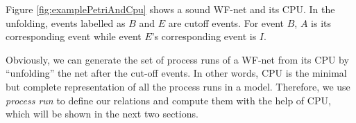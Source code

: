 \documentclass{llncs}
\begin{document}
\begin{example}\label{ex:petriAndCpu}
Figure \ref{fig:examplePetriAndCpu} shows a sound WF-net and its CPU. In the unfolding, events labelled as $B$ and $E$ are cutoff events. For event $B$, $A$ is its corresponding event while event $E$'s corresponding event is $I$.
\end{example}

Obviously, we can generate the set of process runs of a WF-net from its CPU by ``unfolding'' the net after the cut-off events. In other words, CPU is the minimal but complete representation of all the process runs in a model. Therefore, we use \textit{process run} to define our relations and compute them with the help of CPU, which will be shown in the next two sections.


\end{document}
